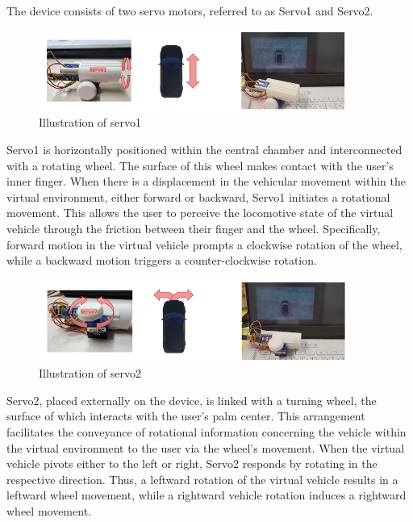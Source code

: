 The device consists of two servo motors, referred to as Servo1 and Servo2. 
\begin{figure}[h]
\centering
\includegraphics[width=0.9\textwidth]{A_thesis/figures/033.png}
\caption{Illustration of servo1}
\end{figure}
Servo1 is horizontally positioned within the central chamber and interconnected with a rotating wheel. The surface of this wheel makes contact with the user's inner finger. When there is a displacement in the vehicular movement within the virtual environment, either forward or backward, Servo1 initiates a rotational movement. This allows the user to perceive the locomotive state of the virtual vehicle through the friction between their finger and the wheel. Specifically, forward motion in the virtual vehicle prompts a clockwise rotation of the wheel, while a backward motion triggers a counter-clockwise rotation.
\begin{figure}[h]
\centering
\includegraphics[width=0.9\textwidth]{A_thesis/figures/034.png}
\caption{Illustration of servo2}
\end{figure}
Servo2, placed externally on the device, is linked with a turning wheel, the surface of which interacts with the user's palm center. This arrangement facilitates the conveyance of rotational information concerning the vehicle within the virtual environment to the user via the wheel's movement. When the virtual vehicle pivots either to the left or right, Servo2 responds by rotating in the respective direction. Thus, a leftward rotation of the virtual vehicle results in a leftward wheel movement, while a rightward vehicle rotation induces a rightward wheel movement.

